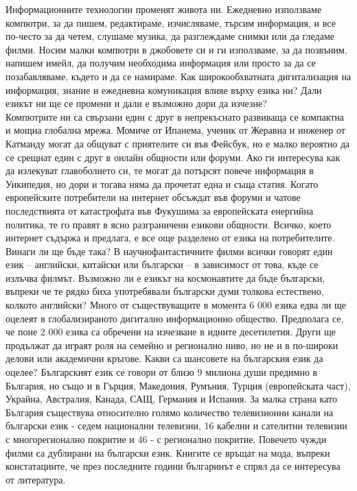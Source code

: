   \begin{multicols}{2}
  Информационните технологии променят живота ни. Ежедневно използваме компютри, за да пишем, редактираме, изчисляваме, търсим информация, и все по-често за да четем, слушаме музика, да разглеждаме снимки или да гледаме филми. Носим малки компютри в джобовете си и ги използваме, за да позвъним, напишем имейл, да получим необходима информация или просто за да се позабавляваме, където и да се намираме. Как широкообхватната дигитализация на информация, знание и ежедневна комуникация влияе върху езика ни? Дали езикът ни ще се промени и дали е възможно дори да изчезне?\\
Компютрите ни са свързани един с друг в непрекъснато развиваща се компактна и мощна глобална мрежа. Момиче от Ипанема, ученик от Жеравна и инженер от Катманду могат да общуват с приятелите си във Фейсбук, но е малко вероятно да се срещнат един с друг в онлайн общности или форуми. Ако ги интересува как да излекуват главоболието си, те могат да потърсят повече информация в Уикипедия, но дори и тогава няма да прочетат една и съща статия. Когато европейските потребители на интернет обсъждат във форуми и чатове последствията от катастрофата във Фукушима за европейската енергийна политика, те го правят в ясно разграничени езикови общности. Всичко, което интернет съдържа и предлага, е все още разделено от езика на потребителите. Винаги ли ще бъде така?
В научнофантастичните филми всички говорят един език – английски, китайски или български – в зависимост от това, къде се излъчва филмът. Възможно ли е езикът на космонавтите да бъде български, въпреки че те рядко биха употребявали български думи толкова естествено, колкото английски? Много от съществуващите в момента 6 000 езика едва ли ще оцелеят в глобализираното дигитално информационно общество. Предполага се, че поне 2 000 езика са обречени на изчезване в идните десетилетия. Други ще продължат да играят роля на семейно и регионално ниво, но не и в по-широки делови или академични кръгове. Какви са шансовете на българския език да оцелее?
Българският език се говори от близо 9 милиона души предимно в България, но също 
и в Гърция, Македония, Румъния, Турция (европейската част), Украйна, Австралия, Канада, САЩ, Германия и Испания. За малка страна като България съществува относително голямо количество телевизионни канали на български език - седем национални телевизии, 16 кабелни и сателитни телевизии с многорегионално покритие и 46 - с регионално покритие.  Повечето чужди филми са дублирани на български език. Книгите се връщат на мода, въпреки констатациите, че през последните години българинът е спрял да се интересува от литература.

\end{multicols}
